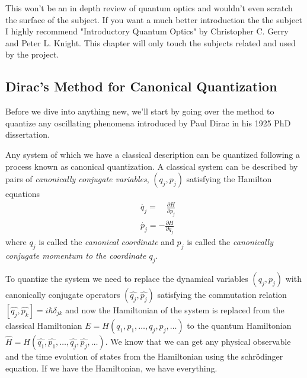 \documentclass[english, a4paper, 12pt, twoside]{article}
\numberwithin{equation}{section} %
\begin{document}
This won't be an in depth review of quantum optics and wouldn't even scratch the surface of the subject. If you want a much better introduction the the subject I highly recommend "Introductory Quantum Optics" by Christopher C. Gerry and Peter L. Knight. This chapter will only touch the subjects related and used by the project.

\subsection{Dirac's Method for Canonical Quantization}
Before we dive into anything new, we'll start by going over the method to quantize any oscillating phenomena introduced by Paul Dirac in his 1925 PhD dissertation.

Any system of which we have a classical description can be quantized following a process known as canonical quantization. A classical system can be described by pairs of \textit{canonically conjugate variables}, $(q_j, p_j)$ satisfying the Hamilton equations
\begin{align*}
    &\dot{q_j} =\quad \frac{\partial H}{\partial p_j} \\
    &\dot{p_j} = -\frac{\partial H}{\partial q_j}
\end{align*}
where $q_j$ is called the \textit{canonical coordinate} and $p_j$ is called the \textit{canonically conjugate momentum to the coordinate $q_j$}.

To quantize the system we need to replace the dynamical variables $(q_j, p_j)$ with canonically conjugate operators $(\hat{q_j}, \hat{p_j})$ satisfying the commutation relation $[\hat{q_j}, \hat{p_k}] = i\hbar \delta_{jk}$ and now the Hamiltonian of the system is replaced from the classical Hamiltonian $E = H(q_1,p_1, \dots ,q_j, p_j, \dots)$ to the quantum Hamiltonian $\hat{H} = H(\hat{q_1},\hat{p_1}, \dots ,\hat{q_j}, \hat{p_j}, \dots)$. We know that we can get any physical observable and the time evolution of states from the Hamiltonian using the schr\"{o}dinger equation. If we have the Hamiltonian, we have everything.
\end{document}
